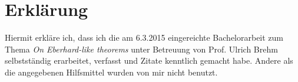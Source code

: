 \newpage
\section*{Erklärung}

Hiermit erkläre ich, dass ich die am 6.3.2015 eingereichte Bachelorarbeit zum Thema
\emph{On Eberhard-like theorems} unter Betreuung von Prof. Ulrich Brehm selbstständig erarbeitet, 
verfasst und Zitate kenntlich gemacht habe. Andere als die angegebenen Hilfsmittel 
wurden von mir nicht benutzt.
